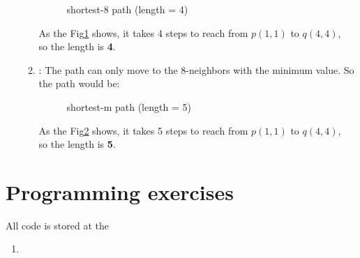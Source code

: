 \documentclass[12pt,a4paper]{article}
\begin{document}
\begin{enumerate}
\begin{enumerate}
\begin{figure}[H]
            \centering
            
            \caption{shortest-8 path (length = 4)}
            \label{fig:2a_s8}
        \end{figure}
        As the Fig\ref{fig:2a_s8} shows, it takes 4 steps to reach from $p(1, 1)$ to $q(4, 4)$,\\ so the length is \textbf{4}.
        \newpage
        \item {}: The path can only move to the 8-neighbors with the minimum value. So the path would be:
        \begin{figure}[H]
            \centering
            
            \caption{shortest-m path (length = 5)}
            \label{fig:2a_sm}
        \end{figure}
        As the Fig\ref{fig:2a_sm} shows, it takes 5 steps to reach from $p(1, 1)$ to $q(4, 4)$,\\ so the length is \textbf{5}.
    \end{enumerate}
\end{enumerate}

\section{Programming exercises}

All code is stored at the 


\begin{enumerate}
    \item 
\end{enumerate}
\end{document}
